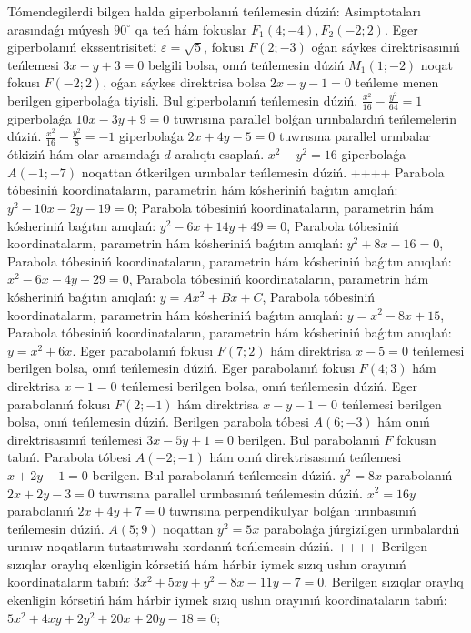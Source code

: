 Tómendegilerdi bilgen halda giperbolanıń teńlemesin dúziń: Asimptotaları arasındaǵı múyesh $90^{\circ}$ qa teń hám fokuslar $F_1 (4;-4), F_2 (-2; 2) $.
Eger giperbolanıń ekssentrisiteti $\varepsilon=\sqrt{5}$, fokusı $F (2;-3) $ oǵan sáykes direktrisasınıń teńlemesi $3 x-y+3=0$ belgili bolsa, onıń teńlemesin dúziń
$M_1 (1;-2) $ noqat fokusı $F (-2; 2) $, oǵan sáykes direktrisa bolsa $2x-y-1=0$ teńleme menen berilgen giperbolaǵa tiyisli. Bul giperbolanıń teńlemesin dúziń.
$\frac{x^2}{16}-\frac{y^2}{64}=1$ giperbolaǵa $10 x-3 y+9=0$ tuwrısına parallel bolǵan urınbalardıń teńlemelerin dúziń.
$\frac{x^2}{16}-\frac{y^2}{8}=-1$ giperbolaǵa $2 x+4 y-5=0$ tuwrısına parallel urınbalar ótkiziń hám olar arasındaǵı $d$ aralıqtı esaplań.
$x^2-y^2=16$ giperbolaǵa $A (-1;-7)$ noqattan ótkerilgen urınbalar teńlemesin dúziń.
++++
Parabola tóbesiniń koordinataların, parametrin hám kósheriniń baǵıtın anıqlań: $y^2-10 x-2 y-19=0$;
Parabola tóbesiniń koordinataların, parametrin hám kósheriniń baǵıtın anıqlań: $y^2-6 x+14 y+49=0$,
Parabola tóbesiniń koordinataların, parametrin hám kósheriniń baǵıtın anıqlań: $y^2+8 x-16=0$,
Parabola tóbesiniń koordinataların, parametrin hám kósheriniń baǵıtın anıqlań: $x^2-6 x-4 y+29=0$,
Parabola tóbesiniń koordinataların, parametrin hám kósheriniń baǵıtın anıqlań: $y=A x^2+B x+C$,
Parabola tóbesiniń koordinataların, parametrin hám kósheriniń baǵıtın anıqlań: $y=x^2-8 x+15$,
Parabola tóbesiniń koordinataların, parametrin hám kósheriniń baǵıtın anıqlań: $y=x^2+6 x$.
Eger parabolanıń fokusı $F (7; 2) $ hám direktrisa $x-5=0$ teńlemesi berilgen bolsa, onıń teńlemesin dúziń.
Eger parabolanıń fokusı $F (4;3) $ hám direktrisa $x-1=0$ teńlemesi berilgen bolsa, onıń teńlemesin dúziń.
Eger parabolanıń fokusı $F(2;-1) $ hám direktrisa $x-y-1=0$ teńlemesi berilgen bolsa, onıń teńlemesin dúziń.
Berilgen parabola tóbesi $A (6;-3) $ hám onıń direktrisasınıń teńlemesi $3x-5y+1=0$ berilgen. Bul parabolanıń $F$ fokusın tabıń.
Parabola tóbesi $A (-2;-1) $ hám onıń direktrisasınıń teńlemesi $x+2y-1=0$ berilgen. Bul parabolanıń teńlemesin dúziń.
$y^2=8x$ parabolanıń $2x+2y-3=0$ tuwrısına parallel urınbasınıń teńlemesin dúziń.
$x^2=16y$ parabolanıń $2x+4y+7=0$ tuwrısına perpendikulyar bolǵan urınbasınıń teńlemesin dúziń.
$A (5;9) $ noqattan $y^2=5x$ parabolaǵa júrgizilgen urınbalardıń urınıw noqatların tutastırıwshı xordanıń teńlemesin dúziń.
++++
Berilgen sızıqlar oraylıq ekenligin kórsetiń hám hárbir iymek sızıq ushın orayınıń koordinataların tabıń: $3x^2+5xy+y^2-8x-11y-7=0$.
Berilgen sızıqlar oraylıq ekenligin kórsetiń hám hárbir iymek sızıq ushın orayınıń koordinataların tabıń:$5 x^2+4 x y+2 y^2+20 x+20 y-18=0$;
